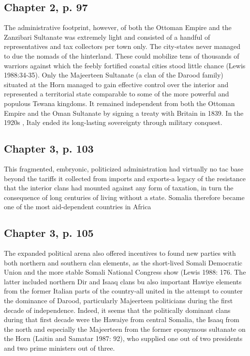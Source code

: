 \documentclass[12pt]{article}
\begin{document}
\subsection{Chapter 2, p. 97}
The administrative footprint, however, of both the Ottoman Empire and the
Zanzibari Sultanate was extremely light and consisted of a handful of
representatives and tax collectors per town only. The city-states never managed
to due the nomads of the hinterland. These could mobilize tens of thousands
of warriors against which the feebly fortified coastal cities stood little
chance (Lewis 1988:34-35). Only the Majeerteen Sultanate (a clan of the Darood
family) situated at the Horn managed to gain effective control over the interior
and represented a territorial state comparable to some of the more powerful and
populous Tswana kingdoms. It remained independent from both the Ottoman Empire
and the Oman Sultanate by signing a treaty with Britain in 1839. In the 1920s ,
Italy ended its long-lasting sovereignty through military conquest.

\subsection{Chapter 3, p. 103}

This fragmented, embryonic, politicized administration had virtually no tac base
beyond the tariffs it collected from imports and exports-a legacy of the
resistance that the interior clans had mounted against any form of taxation, in
turn the consequence of long centuries of living without a state. Somalia
therefore became one of the most aid-dependent countries in Africa

\subsection{Chapter 3, p. 105}

The expanded political arena also offered incentives to found new parties with
both northern and southern clan elements, as the short-lived Somali Democratic
Union and the more stable Somali National Congress show (Lewis 1988: 176. The
latter included northern Dir and Isaaq clans bu also important Hawiye elements
from the former Italian parts of the country-all united in the attempt to
counter the dominance of Darood, particularly Majeerteen politicians during the
first decade of independence. Indeed, it seems that the politically dominant
clans during that first decade were the Hawaiye from central Somalia, the Isaaq
from the north and especially the Majeerteen from the former eponymous sultanate
on the Horn (Laitin and Samatar 1987: 92), who supplied one out of two
presidents and two prime ministers out of three.
\end{document}

